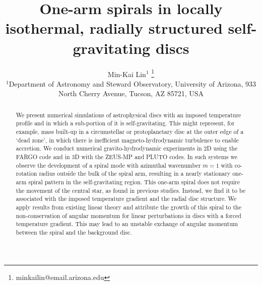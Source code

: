 \documentclass[useAMS,usenatbib]{mn2e}
\title[One-arm spirals]{One-arm spirals in 
  locally isothermal, radially structured self-gravitating discs}
\author[Lin]{Min-Kai Lin$^{1}$
  \thanks{ minkailin@email.arizona.edu} \\ 
  $^1$Department of Astronomy and Steward Observatory, University of
  Arizona, 933 North Cherry Avenue, Tucson, AZ 85721, USA 
}
\begin{document}
\maketitle
\begin{abstract} 
  We present numerical simulations of astrophysical discs with an 
  imposed temperature profile and in which a sub-portion of it is
  self-gravitating. This might represent, for example, mass  
  built-up in a circumstellar or protoplanetary
  disc at the outer edge of a `dead zone', in which there
  is inefficient magneto-hydrodynamic turbulence to enable accretion. 
  We conduct numerical gravito-hydrodynamic experiments in 2D using
  the FARGO code and in 3D with the ZEUS-MP and PLUTO codes. In such
  systems we observe the development of a 
  spiral mode with azimuthal wavenumber $m=1$ with co-rotation radius 
  outside the bulk of the spiral arm, resulting in a nearly stationary 
  one-arm spiral pattern in the self-gravitating region. This one-arm 
  spiral does not require the movement of  
  the central star, as found in previous studies. Instead, we find it 
  to be associated with the imposed 
  temperature gradient and the radial disc structure. 
  We apply results from existing linear theory and attribute the
  growth of this spiral to the non-conservation of angular momentum
  for linear perturbations in discs with a forced temperature
  gradient. This may lead to an unstable exchange of angular momentum between the spiral 
  and the background disc. 

\end{abstract}
\end{document}
